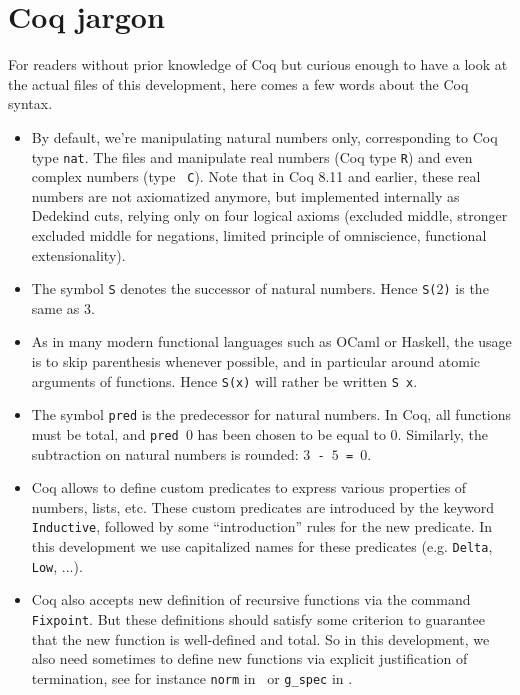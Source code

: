 \documentclass[a4paper,11pt]{article}
\begin{document}
\section{Coq jargon}
For readers without prior knowledge
of Coq but curious enough to have a look at the actual files
of this development, here comes a few words about the Coq syntax.
\begin{itemize}
\item By default, we're manipulating natural numbers only, corresponding
 to Coq type {\tt nat}. The files  and  manipulate
 real numbers (Coq type {\tt R}) and even complex numbers (type {\tt
   C}). Note that in Coq 8.11 and earlier, these real numbers are
 not axiomatized anymore, but implemented internally as Dedekind
 cuts, relying only on four logical axioms (excluded middle,
 stronger excluded middle for negations, limited principle of
 omniscience, functional extensionality).

\item The symbol {\tt S} denotes the successor of natural numbers.
  Hence {\tt S($2$)} is the same as $3$.
\item As in many modern functional languages such as OCaml or Haskell,
  the usage is to skip parenthesis whenever possible, and
  in particular around atomic arguments of functions. Hence
  {\tt S(x)} will rather be written {\tt S x}.
\item The symbol {\tt pred} is the predecessor for natural numbers.
  In Coq, all functions must be total, and {\tt pred $0$} has been
  chosen to be equal to $0$. Similarly, the subtraction on
  natural numbers is rounded: {\tt $3$ - $5$ = $0$}.
\item \TODO Coq allows to define custom predicates to express various
  properties of numbers, lists, etc. These custom predicates are
  introduced by the keyword {\tt Inductive}, followed by some
  ``introduction'' rules for the new predicate. In this development
  we use capitalized names for these predicates (e.g. {\tt Delta},
  {\tt Low}, ...).
\item \TODO Coq also accepts new definition of recursive functions via
  the command {\tt Fixpoint}. But these definitions should satisfy
  some criterion to guarantee that the new function is well-defined
  and total. So in this development, we also need sometimes to
  define new functions via explicit justification of termination,
  see for instance {\tt norm} in \ or {\tt g\_spec} in
  .
\end{itemize}
\end{document}
